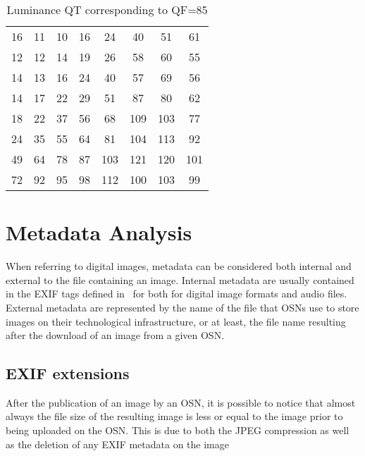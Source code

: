 \documentclass[10pt, conference]{IEEEtran}
\begin{document}
\begin{table}[htbp]
\caption{Luminance QT corresponding to QF=85}
\centering

\begin{tabular}{| c c c c c c c c |}
\hline
16 & 11 & 10 & 16 & 24 & 40 & 51 & 61\\
12 & 12 & 14 & 19 & 26 & 58 & 60 & 55\\
14 & 13 & 16 & 24 & 40 & 57 & 69 & 56\\
14 & 17 & 22 & 29 & 51 & 87 & 80 & 62\\
18 & 22 & 37 & 56 & 68 & 109 & 103 & 77\\
24 & 35 & 55 & 64 & 81 & 104 & 113 & 92\\
49 & 64 & 78 & 87 & 103 & 121 & 120 & 101\\
72 & 92 & 95 & 98 & 112 & 100 & 103 & 99\\
\hline

\end{tabular}

\label{tab:QTFacebook}
\end{table}




\section{Metadata Analysis}
\label{sec3}
When referring to digital images, metadata can be considered both internal and external to the file containing an image. Internal metadata are usually contained in the EXIF tags defined in~\cite{exif} for both for digital image formats and audio files. External metadata are represented by the name of the file that OSNs use to store images on their technological infrastructure, or at least, the file name resulting after the download of an image from a given OSN.

\subsection{EXIF extensions}
\label{sec3:exif}
After the publication of an image by an OSN, it is possible to notice that almost always the file size of the resulting image is less or equal to the image prior to being uploaded on the OSN. This is due to both the JPEG compression as well as the deletion of any EXIF metadata on the image
\end{document}

